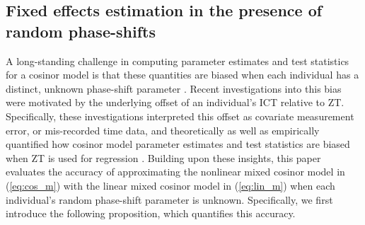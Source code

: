 \subsection{Fixed effects estimation in the presence of random phase-shifts} \label{sec:2.2}
A long-standing challenge in computing parameter estimates and test statistics for a cosinor model is that these quantities are biased when each individual has a distinct, unknown phase-shift parameter \citep{Sollberger1962, Weaver1995}. Recent investigations into this bias were motivated by the underlying offset of an individual's ICT relative to ZT. Specifically, these investigations interpreted this offset as covariate measurement error, or mis-recorded time data, and theoretically  as well as empirically quantified how cosinor model parameter estimates and test statistics are biased when ZT is used for regression \citep{Gorczyca2023, Gorczyca2024}. Building upon these insights, this paper evaluates the accuracy of approximating the nonlinear mixed cosinor model in (\ref{eq:cos_m}) with the linear mixed cosinor model in (\ref{eq:lin_m}) when each individual's random phase-shift parameter is unknown. Specifically, we first introduce the following proposition, which quantifies this accuracy.


